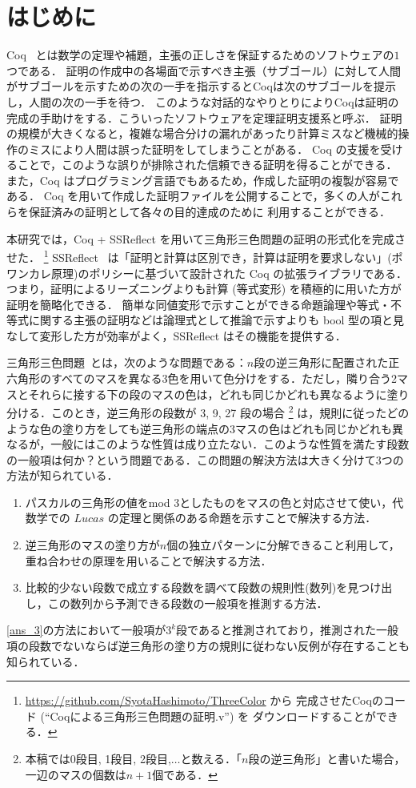 \section{はじめに} \label{sec:start}
Coq~\cite{Coq} とは数学の定理や補題，主張の正しさを保証するためのソフトウェアの$1$つである．
証明の作成中の各場面で示すべき主張（サブゴール）に対して人間がサブゴールを示すための次の一手を指示するとCoqは次のサブゴールを提示し，人間の次の一手を待つ．
このような対話的なやりとりによりCoqは証明の完成の手助けをする．こういったソフトウェアを定理証明支援系と呼ぶ．
証明の規模が大きくなると，複雑な場合分けの漏れがあったり計算ミスなど機械的操作のミスにより人間は誤った証明をしてしまうことがある．
Coq の支援を受けることで，このような誤りが排除された信頼できる証明を得ることができる．
また，Coq はプログラミング言語でもあるため，作成した証明の複製が容易である．
Coq を用いて作成した証明ファイルを公開することで，多くの人がこれらを保証済みの証明として各々の目的達成のために
利用することができる．

本研究では，Coq + SSReflect を用いて三角形三色問題の証明の形式化を完成させた．
\footnote{
  \url{https://github.com/SyotaHashimoto/ThreeColor} から
  完成させたCoqのコード (``Coqによる三角形三色問題の証明.v'') を
  ダウンロードすることができる．
}
SSReflect~\cite{SSReflect,CoqBook} は「証明と計算は区別でき，計算は証明を要求しない」(ポワンカレ原理)のポリシーに基づいて設計された Coq の拡張ライブラリである．
つまり，証明によるリーズニングよりも計算 (等式変形) を積極的に用いた方が証明を簡略化できる．
簡単な同値変形で示すことができる命題論理や等式・不等式に関する主張の証明などは論理式として推論で示すよりも bool 型の項と見なして変形した方が効率がよく，SSReflect はその機能を提供する．

三角形三色問題~\cite{Nishiyama1,Nishiyama2,Nishiyama3}とは，次のような問題である：$n$段の逆三角形に配置された正六角形のすべてのマスを異なる3色を用いて色分けをする．ただし，隣り合う2マスとそれらに接する下の段のマスの色は，どれも同じかどれも異なるように塗り分ける．このとき，逆三角形の段数が 3, 9, 27 段の場合 \footnote{本稿では0段目, 1段目, 2段目,$\ldots$と数える．「$n$段の逆三角形」と書いた場合，一辺のマスの個数は$n+1$個である．} は，規則に従ったどのような色の塗り方をしても逆三角形の端点の3マスの色はどれも同じかどれも異なるが，一般にはこのような性質は成り立たない．このような性質を満たす段数の一般項は何か？という問題である．この問題の解決方法は大きく分けて3つの方法が知られている．\cite{Nishiyama1}
\begin{enumerate}
\item \label{ans_1}
  パスカルの三角形の値をmod $3$としたものをマスの色と対応させて使い，代数学での $Lucas$ の定理と関係のある命題を示すことで解決する方法．
\item \label{ans_2}
  逆三角形のマスの塗り方が$n$個の独立パターンに分解できること利用して，重ね合わせの原理を用いることで解決する方法．
\item \label{ans_3}
  比較的少ない段数で成立する段数を調べて段数の規則性(数列)を見つけ出し，この数列から予測できる段数の一般項を推測する方法．
\end{enumerate}
\ref{ans_3}の方法において一般項が$3^k$段であると推測されており，推測された一般項の段数でないならば逆三角形の塗り方の規則に従わない反例が存在することも知られている．

